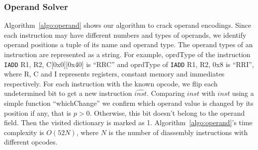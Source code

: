 
\subsubsection{Operand Solver}
Algorithm~\ref{algo:operand} shows our algorithm to crack operand encodings.
Since each instruction may have different numbers and types of operands, we identify operand positions a tuple of its name and operand type. 
The operand types of an instruction are represented as a string.
For example, oprdType of the instruction {\tt IADD} R1, R2, C[0x0][0x40] is ``RRC'' and oprdType of {\tt IADD} R1, R2, 0x8 is ``RRI'', where R, C and I represents registers, constant memory and immediates respectively.
For each instruction with the known opcode, we flip each undetermined bit to get a new instruction $\widehat{inst}$.
Comparing $inst$ with $\widehat{inst}$ using a simple function ``whichChange'' we confirm which operand value is changed by its position if any, that is $p>0$.
Otherwise, this bit doesn't belong to the operand field.
Then the visited dictionary is marked as 1.
Algorithm~\ref{algo:operand}'s time complexity is $O(52N)$, where $N$ is the number of diassembly instructions with different opcodes.

